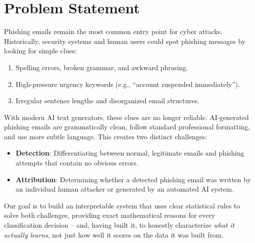 \documentclass[11pt]{article}
\begin{document}
\section{Problem Statement}
Phishing emails remain the most common entry point for cyber attacks. Historically, security
systems and human users could spot phishing messages by looking for simple clues:
\begin{enumerate}
    \item Spelling errors, broken grammar, and awkward phrasing.
    \item High-pressure urgency keywords (e.g., ``account suspended immediately'').
    \item Irregular sentence lengths and disorganized email structures.
\end{enumerate}

With modern AI text generators, these clues are no longer reliable. AI-generated phishing
emails are grammatically clean, follow standard professional formatting, and use more subtle
language. This creates two distinct challenges:
\begin{itemize}
    \item \textbf{Detection}: Differentiating between normal, legitimate emails and phishing attempts that
      contain no obvious errors.
    \item \textbf{Attribution}: Determining whether a detected phishing email was written by an individual
      human attacker or generated by an automated AI system.
\end{itemize}

Our goal is to build an interpretable system that uses clear statistical rules to solve both
challenges, providing exact mathematical reasons for every classification decision -- and, having
built it, to honestly characterize \emph{what it actually learns}, not just how well it scores on
the data it was built from.
\end{document}
